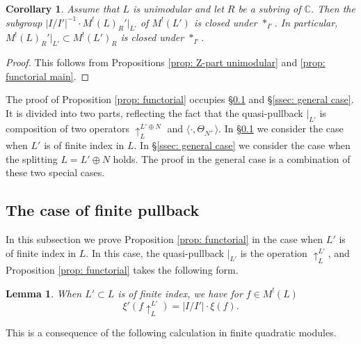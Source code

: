 \documentclass[12pt]{amsart}
\numberwithin{equation}{section}
\newtheorem{lemma}[theorem]{Lemma}
\newtheorem{corollary}[theorem]{Corollary}
\theoremstyle{definition}
\theoremstyle{remark}
\newcommand{\C}{\mathbb{C}}
\newcommand{\ML}{M^{!}(L)}
\begin{document}


\begin{corollary}\label{cor: functorial add consequence II}
Assume that $L$ is unimodular and let $R$ be a subring of ${\C}$. 
Then the subgroup $|I/I'|^{-1}\cdot M^!(L)_{R}'|_{L'}$ of $M^!(L')$ is closed under $\ast_{I'}$. 
In particular, $M^{!}(L)_{R}'|_{L'}\subset M^{!}(L')_{R}$ is closed under $\ast_{I'}$. 
\end{corollary}

\begin{proof}
This follows from Propositions \ref{prop: Z-part unimodular} and \ref{prop: functorial main}. 
\end{proof}

The proof of Proposition \ref{prop: functorial} occupies \S \ref{ssec: finite pullback} and \S \ref{ssec: general case}. 
It is divided into two parts, 
reflecting the fact that the quasi-pullback $|_{L'}$ is composition of 
two operators $\uparrow_{L}^{L'\oplus N}$ and $\langle \cdot, \Theta_{N^{+}} \rangle$. 
In \S \ref{ssec: finite pullback} we consider the case when $L'$ is of finite index in $L$. 
In \S \ref{ssec: general case} we consider the case when the splitting $L=L'\oplus N$ holds. 
The proof in the general case is a combination of these two special cases.  


\subsection{The case of finite pullback}\label{ssec: finite pullback} 

In this subsection we prove Proposition \ref{prop: functorial} 
in the case when $L'$ is of finite index in $L$. 
In this case, the quasi-pullback $|_{L'}$ is the operation $\uparrow^{L'}_{L}$, 
and Proposition \ref{prop: functorial} takes the following form. 

\begin{lemma}\label{prop: finite pullback}
When $L'\subset L$ is of finite index, we have for $f \in {\ML}$ 
\begin{equation*}
\xi'(f\!\uparrow^{L'}_{L}) = |I/I'| \cdot \xi(f).  
\end{equation*}
\end{lemma}

This is a consequence of the following calculation in 
finite quadratic modules. 
\end{document}
